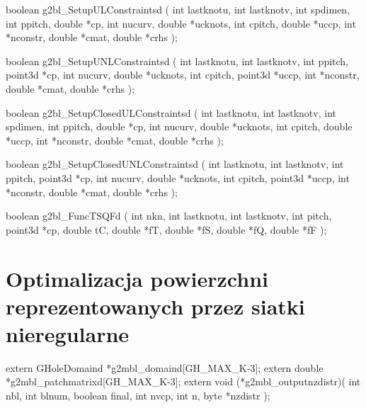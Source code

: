 \begin{listingC}
boolean g2bl_SetupULConstraintsd ( int lastknotu, int lastknotv, int
spdimen,
                                   int ppitch, double *cp,
                                   int nucurv, double *ucknots,
                                   int cpitch, double *uccp,   
                                   int *nconstr, double *cmat, double *crhs
                                   );

boolean g2bl_SetupUNLConstraintsd ( int lastknotu, int lastknotv,
                                    int ppitch, point3d *cp,
                                    int nucurv, double *ucknots,
                                    int cpitch, point3d *uccp,  
                                    int *nconstr, double *cmat, double *crhs
                                    );


boolean g2bl_SetupClosedULConstraintsd ( int lastknotu, int lastknotv, int
spdimen,
                                         int ppitch, double *cp,
                                         int nucurv, double *ucknots,
                                         int cpitch, double *uccp,   
                                         int *nconstr, double *cmat, double
                                         *crhs );

boolean g2bl_SetupClosedUNLConstraintsd ( int lastknotu, int lastknotv,
                                          int ppitch, point3d *cp,
                                          int nucurv, double *ucknots,
                                          int cpitch, point3d *uccp,  
                                          int *nconstr, double *cmat, double
                                          *crhs );
\end{listingC}

\begin{listingC}
boolean g2bl_FuncTSQFd ( int nkn,
                         int lastknotu, int lastknotv, int pitch, point3d
*cp,
                         double tC,
                         double *fT, double *fS, double *fQ, double *fF );
\end{listingC}



\section{Optimalizacja powierzchni reprezentowanych przez siatki nieregularne}

\begin{listingC}
extern GHoleDomaind *g2mbl_domaind[GH_MAX_K-3];
extern double *g2mbl_patchmatrixd[GH_MAX_K-3]; 
extern void (*g2mbl_outputnzdistr)( int nbl, int blnum, boolean final,
                                    int nvcp, int n, byte *nzdistr ); 
\end{listingC}

